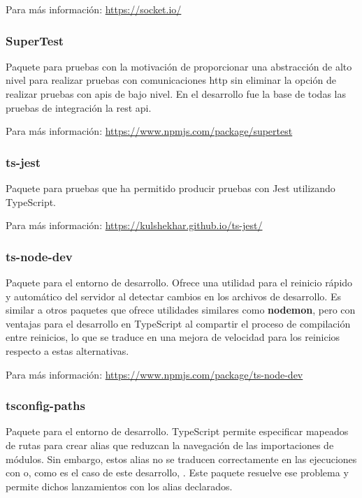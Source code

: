 Para más información: \href{https://socket.io/}{https://socket.io/}

\subsubsection{SuperTest}
\label{lib:api:supertest}

Paquete para pruebas con la motivación de proporcionar una abstracción de alto nivel para realizar pruebas con comunicaciones \acrshort{http} sin eliminar la opción de realizar pruebas con \acrshort{api}s de bajo nivel. En el desarrollo fue la base de todas las pruebas de integración la \acrshort{rest} \acrshort{api}.

Para más información: \href{https://www.npmjs.com/package/supertest}{https://www.npmjs.com/package/supertest}

\subsubsection{ts-jest}
\label{lib:api:ts_jest}

Paquete para pruebas que ha permitido producir pruebas con Jest utilizando TypeScript.

Para más información: \href{https://kulshekhar.github.io/ts-jest/}{https://kulshekhar.github.io/ts-jest/}

\subsubsection{ts-node-dev}
\label{lib:api:ts_node_dev}

Paquete para el entorno de desarrollo. Ofrece una utilidad para el reinicio rápido y automático del servidor al detectar cambios en los archivos de desarrollo. Es similar a otros paquetes que ofrece utilidades similares como \textbf{nodemon}, pero con ventajas para el desarrollo en TypeScript al compartir el proceso de compilación entre reinicios, lo que se traduce en una mejora de velocidad para los reinicios respecto a estas alternativas.

Para más información: \href{https://www.npmjs.com/package/ts-node-dev}{https://www.npmjs.com/package/ts-node-dev}

\subsubsection{tsconfig-paths}
\label{lib:api:tsconfig_paths}

Paquete para el entorno de desarrollo. TypeScript permite especificar mapeados de rutas para crear alias que reduzcan la navegación de las importaciones de módulos. Sin embargo, estos alias no se traducen correctamente en las ejecuciones con  o, como es el caso de este desarrollo, . Este paquete resuelve ese problema y permite dichos lanzamientos con los alias declarados.

